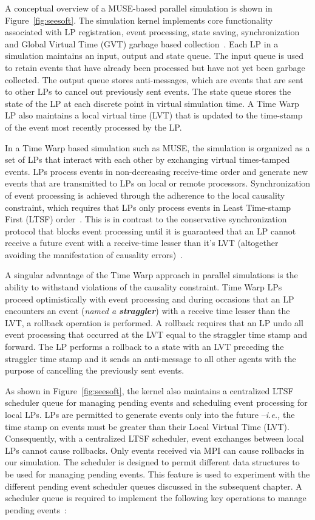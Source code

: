 A conceptual overview of a MUSE-based parallel simulation is shown in Figure~\ref{fig:seesoft}. The simulation kernel implements core functionality associated with LP registration, event processing, state saving, synchronization and Global Virtual Time (GVT) garbage based collection~\cite{higiro2017multi}. Each LP in a simulation maintains an input, output and state queue. The input queue is used to retain events that have already been processed but have not yet been garbage collected. The output queue stores anti-messages, which are events that are sent to other LPs to cancel out previously sent events. The state queue stores the state of the LP at each discrete point in virtual simulation time. A Time Warp LP also maintains a local virtual time (LVT) that is updated to the time-stamp of the event most recently processed by the LP. 

In a Time Warp based simulation such as MUSE, the simulation is organized as a set of LPs that interact with each other by exchanging virtual times-tamped events. LPs process events in non-decreasing receive-time order and generate new events that are transmitted to LPs on local or remote processors. Synchronization of event processing is achieved through the adherence to the local causality constraint, which requires that LPs only process events in Least Time-stamp First (LTSF) order~\cite{jafer-13}. This is in contrast to the conservative synchronization protocol that blocks event processing until it is guaranteed that an LP cannot receive a future event with a receive-time lesser than it's LVT (altogether avoiding the manifestation of causality errors)~\cite{jafer-13}.

A singular advantage of the Time Warp approach in parallel simulations is the ability to withstand violations of the causality constraint. Time Warp LPs proceed optimistically with event processing and during occasions that an LP encounters an event (\textit{named a \textbf{straggler}}) with a receive time lesser than the LVT, a rollback operation is performed. A rollback requires that an LP undo all event processing that occurred at the LVT equal to the straggler time stamp and forward. The LP performs a rollback to a state with an LVT preceding the straggler time stamp and it sends an anti-message to all other agents with the purpose of cancelling the previously sent events.

As shown in Figure~\ref{fig:seesoft}, the kernel also maintains a centralized LTSF scheduler queue for managing pending events and scheduling event processing for local LPs. LPs are permitted to generate events only into the future --\textit{i.e.,} the time stamp on events must be greater than their Local Virtual Time (LVT). Consequently, with a centralized LTSF scheduler, event exchanges between local LPs cannot cause rollbacks. Only events received via MPI can cause rollbacks in our simulation. The scheduler is designed to permit different data structures to be used for managing pending events. This feature is used to experiment with the different pending event scheduler queues discussed in the subsequent chapter. A scheduler queue is required to implement the following key operations to manage pending events~\cite{higiro2017multi}:

